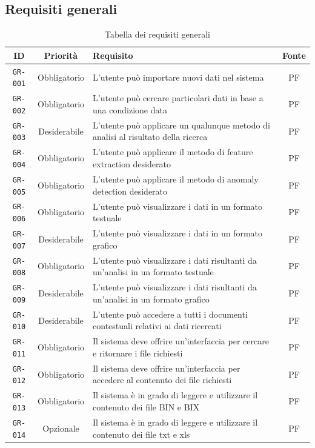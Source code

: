 \subsection{Requisiti generali}
\begin{table} [H]
	\centering
	\begin{tabularx}{\textwidth}{|c c X c|} 
		\hline
		ID & Priorità & Requisito & Fonte \\ [0.5ex] 
		\hline\hline
		\texttt{GR-001} & Obbligatorio & L'utente può importare nuovi dati nel sistema & PF \\ 
		\hline
		\texttt{GR-002} & Obbligatorio & L'utente può cercare particolari dati in base a una condizione data & PF \\ 
		\hline
		\texttt{GR-003} & Desiderabile & L'utente può applicare un qualunque metodo di analisi al risultato della ricerca & PF \\ 
		\hline
		\texttt{GR-004} & Obbligatorio & L'utente può applicare il metodo di feature extraction desiderato & PF \\ 
		\hline
		\texttt{GR-005} & Obbligatorio & L'utente può applicare il metodo di anomaly detection desiderato & PF \\ 
		\hline
		\texttt{GR-006} & Obbligatorio & L'utente può visualizzare i dati in un formato testuale & PF \\ 
		\hline
		\texttt{GR-007} & Desiderabile & L'utente può visualizzare i dati in un formato grafico & PF \\ 
		\hline
		\texttt{GR-008} & Obbligatorio & L'utente può visualizzare i dati risultanti da un'analisi in un formato testuale & PF \\ 
		\hline
		\texttt{GR-009} & Desiderabile &L'utente può visualizzare i dati risultanti da un'analisi in un formato grafico & PF \\ 
		\hline
		\texttt{GR-010} & Desiderabile & L'utente può accedere a tutti i documenti contestuali relativi ai dati ricercati & PF \\ 
		\hline
		\texttt{GR-011} & Obbligatorio & Il sistema deve offrire un'interfaccia per cercare e ritornare i file richiesti & PF \\ 
		\hline
		\texttt{GR-012} & Obbligatorio & Il sistema deve offrire un'interfaccia per accedere al contenuto dei file richiesti & PF \\ 
		\hline
		\texttt{GR-013} & Obbligatorio & Il sistema è in grado di leggere e utilizzare il contenuto dei file BIN e BIX & PF \\ 
		\hline
		\texttt{GR-014} & Opzionale & Il sistema è in grado di leggere e utilizzare il contenuto dei file txt e xls & PF \\ 
		\hline

	\end{tabularx}
	\caption{Tabella dei requisiti generali}
\end{table}


